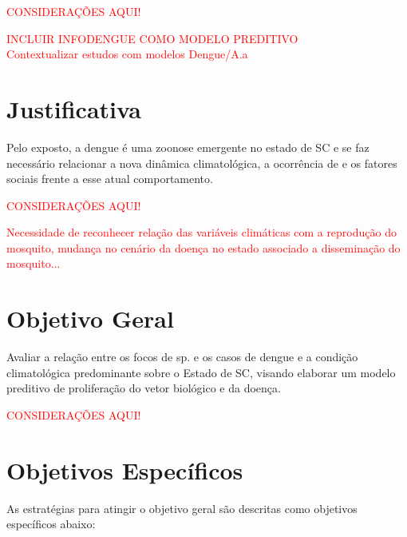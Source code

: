 \begin{center}
\textcolor{red}{CONSIDERAÇÕES AQUI!}\\ 
\end{center}
\textcolor{red}{INCLUIR INFODENGUE COMO MODELO PREDITIVO}\\
\textcolor{red}{Contextualizar estudos com modelos Dengue/A.a}
\newpage
\section{Justificativa}
\indent Pelo exposto, a dengue é uma zoonose emergente no estado de \acrlong{SC} e se faz necessário relacionar a nova dinâmica climatológica, a ocorrência de  e os fatores sociais frente a esse atual comportamento.
\begin{center}
\textcolor{red}{CONSIDERAÇÕES AQUI!}\\ 
\end{center}
\textcolor{red}{Necessidade de reconhecer relação das variáveis climáticas com a reprodução do mosquito, mudança no cenário da doença no estado associado a disseminação do mosquito...}\\
 
 \section{Objetivo Geral}
 Avaliar a relação entre os focos de  sp. e os casos de dengue e a condição climatológica predominante sobre o Estado de \acrlong{SC}, visando elaborar um modelo preditivo de proliferação do vetor biológico e da doença.

\begin{center}
\textcolor{red}{CONSIDERAÇÕES AQUI!}\\ 
\end{center}



 
\section{Objetivos Específicos}
As estratégias para atingir o objetivo geral são descritas como objetivos específicos abaixo:

